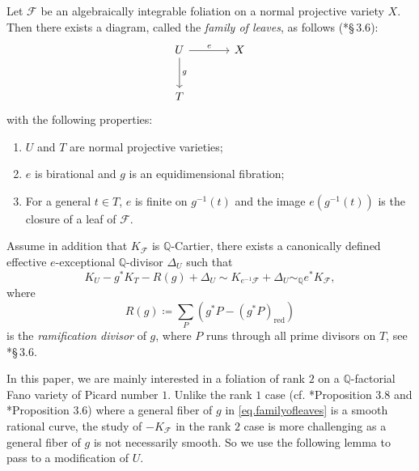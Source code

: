 \documentclass[12pt,twoside]{amsart}
\DeclareMathOperator{\red}{red}
\theoremstyle{definition}
\begin{document}
Let $\mathcal{F}$ be an algebraically integrable foliation on a normal projective variety $X$. Then there exists a diagram, called the \emph{family of leaves}, as follows (\cite{druel}*{\S\,3.6}):
\begin{equation}\label{eq.familyofleaves}
    \begin{tikzcd}[row sep=large, column sep=large]
	U \arrow[r,"e"] \arrow[d,"g"]
	& X \\
	T
    \end{tikzcd}
\end{equation}
with the following properties: 
\begin{enumerate}
    \item $U$ and $T$ are normal projective varieties;
    \item $e$ is birational and $g$ is an equidimensional fibration;
    \item For a general $t\in T$, $e$ is finite on $g^{-1}(t)$ and the image $e(g^{-1}(t))$ is the closure of a leaf of $\mathcal{F}$. 
\end{enumerate} 
Assume in addition that $K_{\mathcal{F}}$ is $\mathbb{Q}$-Cartier, there exists a canonically defined effective $e$-exceptional $\mathbb{Q}$-divisor $\Delta_U$ such that 
\begin{equation}\label{eq.PullBackKF}
    K_U-g^*K_T-R(g) + \Delta_U\sim K_{e^{-1}\mathcal{F}} + \Delta_U \sim_{\mathbb{Q}} e^*K_{\mathcal{F}},
\end{equation}
where 
\[
    R(g)\coloneq\sum_P(g^*P-(g^*P)_{\red})
\]
is the \emph{ramification divisor} of $g$, where $P$ runs through all prime divisors on $T$, see \cite{druel}*{\S\,3.6}. 

In this paper, we are mainly interested in a foliation of rank $2$ on a $\mathbb Q$-factorial Fano variety of Picard number $1$. Unlike the rank $1$ case (cf. \cite{liu-liu}*{Proposition 3.8} and \cite{jiang-liu-liu}*{Proposition 3.6}) where a general fiber of $g$ in \eqref{eq.familyofleaves} is a smooth rational curve, the study of $-K_{\mathcal F}$ in the rank $2$ case is more challenging as a general fiber of $g$ is not necessarily smooth. So we use the following lemma to pass to a modification of $U$.
\end{document}
